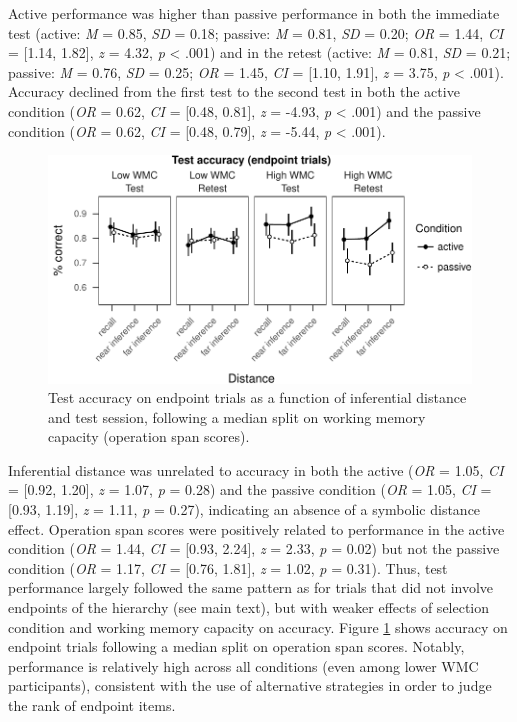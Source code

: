 \documentclass[floatsintext,man]{apa6}
\theoremstyle{definition}
\theoremstyle{definition}
\theoremstyle{definition}
\theoremstyle{remark}
\begin{document}
Active performance was higher than passive performance in both the
immediate test (active: \emph{M} = 0.85, \emph{SD} = 0.18; passive:
\emph{M} = 0.81, \emph{SD} = 0.20; \emph{OR} = 1.44, \emph{CI} =
{[}1.14, 1.82{]}, \emph{z} = 4.32, \emph{p} \textless{} .001) and in the
retest (active: \emph{M} = 0.81, \emph{SD} = 0.21; passive: \emph{M} =
0.76, \emph{SD} = 0.25; \emph{OR} = 1.45, \emph{CI} = {[}1.10, 1.91{]},
\emph{z} = 3.75, \emph{p} \textless{} .001). Accuracy declined from the
first test to the second test in both the active condition (\emph{OR} =
0.62, \emph{CI} = {[}0.48, 0.81{]}, \emph{z} = -4.93, \emph{p}
\textless{} .001) and the passive condition (\emph{OR} = 0.62, \emph{CI}
= {[}0.48, 0.79{]}, \emph{z} = -5.44, \emph{p} \textless{} .001).

\begin{figure}
\centering
\includegraphics{active_transitive_inference_files/figure-latex/unnamed-chunk-6-1.pdf}
\caption{\label{fig:unnamed-chunk-6}Test accuracy on endpoint trials as a
function of inferential distance and test session, following a median
split on working memory capacity (operation span scores).
\label{fig_acc_endpoint}}
\end{figure}

Inferential distance was unrelated to accuracy in both the active
(\emph{OR} = 1.05, \emph{CI} = {[}0.92, 1.20{]}, \emph{z} = 1.07,
\emph{p} = 0.28) and the passive condition (\emph{OR} = 1.05, \emph{CI}
= {[}0.93, 1.19{]}, \emph{z} = 1.11, \emph{p} = 0.27), indicating an
absence of a symbolic distance effect. Operation span scores were
positively related to performance in the active condition (\emph{OR} =
1.44, \emph{CI} = {[}0.93, 2.24{]}, \emph{z} = 2.33, \emph{p} = 0.02)
but not the passive condition (\emph{OR} = 1.17, \emph{CI} = {[}0.76,
1.81{]}, \emph{z} = 1.02, \emph{p} = 0.31). Thus, test performance
largely followed the same pattern as for trials that did not involve
endpoints of the hierarchy (see main text), but with weaker effects of
selection condition and working memory capacity on accuracy. Figure
\ref{fig_acc_endpoint} shows accuracy on endpoint trials following a
median split on operation span scores. Notably, performance is
relatively high across all conditions (even among lower WMC
participants), consistent with the use of alternative strategies in
order to judge the rank of endpoint items.
\end{document}
